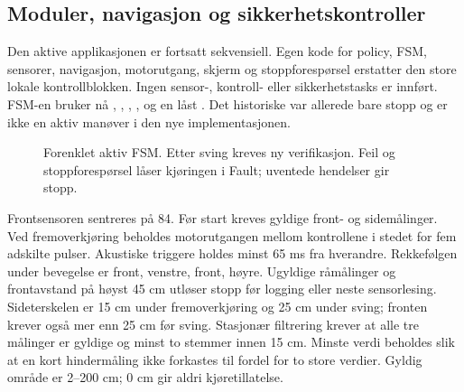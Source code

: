 \subsection{Moduler, navigasjon og sikkerhetskontroller}
Den aktive applikasjonen er fortsatt sekvensiell. Egen kode for
policy, FSM, sensorer, navigasjon, motorutgang, skjerm og stoppforespørsel
erstatter den store lokale kontrollblokken. Ingen sensor-, kontroll- eller
sikkerhetstasks er innført. FSM-en bruker nå , ,
, ,  og en låst .
Det historiske  var allerede bare stopp og er ikke
en aktiv manøver i den nye implementasjonen.

\begin{figure}[htbp]
\centering
{}
\caption{Forenklet aktiv FSM. Etter sving kreves ny verifikasjon.
Feil og stoppforespørsel låser kjøringen i Fault; uventede hendelser gir stopp.}
\label{fig:fsm23}
\end{figure}

Frontsensoren sentreres på 84\textdegree{}. Før start kreves gyldige
front- og sidemålinger. Ved fremoverkjøring beholdes motorutgangen mellom
kontrollene i stedet for fem adskilte pulser. Akustiske triggere holdes
minst 65 ms fra hverandre. Rekkefølgen under bevegelse er front, venstre,
front, høyre. Ugyldige råmålinger og frontavstand på høyst 45 cm
utløser stopp før logging eller neste sensorlesing. Sideterskelen er
15 cm under fremoverkjøring og 25 cm under sving; fronten krever også
mer enn 25 cm før sving. Stasjonær filtrering krever at alle tre målinger
er gyldige og minst to stemmer innen 15 cm. Minste verdi beholdes slik
at en kort hindermåling ikke forkastes til fordel for to store verdier.
Gyldig område er 2--200 cm; 0 cm gir aldri kjøretillatelse.

